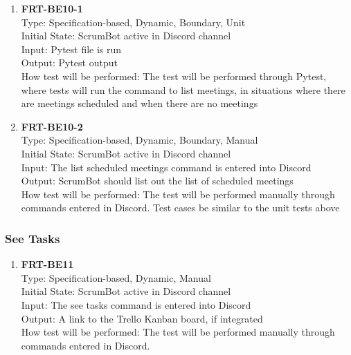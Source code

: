 \documentclass[12pt, titlepage]{article}
\begin{document}
\begin{enumerate}
    \item{\textbf{FRT-BE10-1}}\\
    Type: Specification-based, Dynamic, Boundary, Unit\\
    Initial State: ScrumBot active in Discord channel\\
    Input: Pytest file is run\\
    Output: Pytest output\\
    How test will be performed: The test will be performed through Pytest, where tests will run the command to list meetings, in situations where there are meetings scheduled and when there are no meetings\\
    
    \item{\textbf{FRT-BE10-2}}\\
    Type: Specification-based, Dynamic, Boundary, Manual\\
    Initial State: ScrumBot active in Discord channel\\
    Input: The list scheduled meetings command is entered into Discord\\
    Output: ScrumBot should list out the list of scheduled meetings\\
    How test will be performed: The test will be performed manually through commands entered in Discord. Test cases be similar to the unit tests above\\
\end{enumerate}

\subsubsection{See Tasks}

\begin{enumerate}
    \item{\textbf{FRT-BE11}}\\
    Type: Specification-based, Dynamic, Manual\\
    Initial State: ScrumBot active in Discord channel\\
    Input: The see tasks command is entered into Discord\\
    Output: A link to the Trello Kanban board, if integrated\\
    How test will be performed: The test will be performed manually through commands entered in Discord.\\
\end{enumerate}
\end{document}
